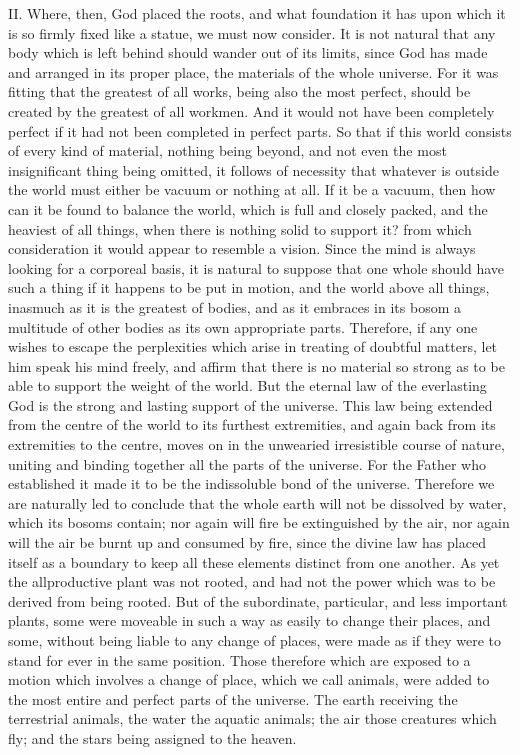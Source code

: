 II. Where, then, God placed the roots, and what foundation it has upon which it is so firmly fixed like
a statue, we must now consider. It is not natural that any body which is left behind should wander
out of its limits, since God has made and arranged in its proper place, the materials of the whole
universe. For it was fitting that the greatest of all works, being also the most perfect, should be
created by the greatest of all workmen. And it would not have been completely perfect if it had not
been completed in perfect parts. So that if this world consists of every kind of material, nothing
being beyond, and not even the most insignificant thing being omitted, it follows of necessity that
whatever is outside the world must either be vacuum or nothing at all. If it be a vacuum, then how
can it be found to balance the world, which is full and closely packed, and the heaviest of all things,
when there is nothing solid to support it? from which consideration it would appear to resemble a
vision. Since the mind is always looking for a corporeal basis, it is natural to suppose that one
whole should have such a thing if it happens to be put in motion, and the world above all things,
inasmuch as it is the greatest of bodies, and as it embraces in its bosom a multitude of other
bodies as its own appropriate parts. Therefore, if any one wishes to escape the perplexities which
arise in treating of doubtful matters, let him speak his mind freely, and affirm that there is no
material so strong as to be able to support the weight of the world. But the eternal law of the
everlasting God is the strong and lasting support of the universe. This law being extended from the
centre of the world to its furthest extremities, and again back from its extremities to the centre,
moves on in the unwearied irresistible course of nature, uniting and binding together all the parts of
the universe. For the Father who established it made it to be the indissoluble bond of the universe.
Therefore we are naturally led to conclude that the whole earth will not be dissolved by water, which
its bosoms contain; nor again will fire be extinguished by the air, nor again will the air be burnt up
and consumed by fire, since the divine law has placed itself as a boundary to keep all these
elements distinct from one another. As yet the allproductive plant was not rooted, and had not the
power which was to be derived from being rooted. But of the subordinate, particular, and less
important plants, some were moveable in such a way as easily to change their places, and some,
without being liable to any change of places, were made as if they were to stand for ever in the
same position. Those therefore which are exposed to a motion which involves a change of place,
which we call animals, were added to the most entire and perfect parts of the universe. The earth
receiving the terrestrial animals, the water the aquatic animals; the air those creatures which fly;
and the stars being assigned to the heaven.

